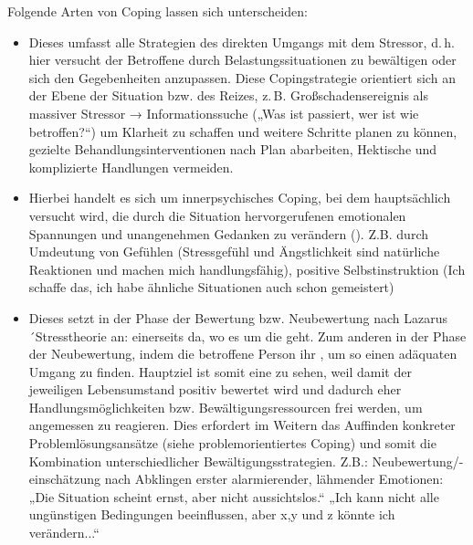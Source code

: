 {Folgende Arten von Coping lassen sich unterscheiden\cite{ZimbardoPsych6}:

\begin{itemize}
  \item {}
  Dieses umfasst alle Strategien des direkten Umgangs mit dem
  Stressor, d.\,h. hier versucht der Betroffene durch
   Belastungssituationen zu
  bewältigen oder sich den Gegebenheiten anzupassen. Diese
  Copingstrategie orientiert sich an der Ebene der Situation
  bzw. des Reizes, z.\,B. Großschadensereignis als massiver Stressor → Informationssuche („Was ist passiert, wer ist wie betroffen?“) um Klarheit zu schaffen und weitere Schritte planen zu können, gezielte Behandlungsinterventionen nach Plan abarbeiten, Hektische und komplizierte Handlungen vermeiden.
  \item {}
  Hierbei handelt es sich um innerpsychisches Coping, bei dem
  hauptsächlich versucht wird, die durch die Situation
  hervorgerufenen emotionalen Spannungen und unangenehmen
  Gedanken zu verändern (). Z.B. durch Umdeutung von Gefühlen (Stressgefühl und Ängstlichkeit sind natürliche Reaktionen und machen mich handlungsfähig), positive Selbstinstruktion (Ich schaffe das, ich habe ähnliche Situationen auch schon gemeistert)
  \item {}
  Dieses setzt in der Phase der Bewertung bzw. Neubewertung
  nach Lazarus´Stresstheorie an: einerseits da, wo es um die
   geht. Zum anderen in der Phase
  der Neubewertung, indem die betroffene Person ihr
  , um so
  einen adäquaten Umgang zu finden. Hauptziel ist somit eine
   zu sehen, weil damit
  der jeweiligen Lebensumstand positiv bewertet wird und
  dadurch eher Handlungsmöglichkeiten bzw.
  Bewältigungsressourcen frei werden, um angemessen zu
  reagieren. Dies erfordert im Weitern das Auffinden konkreter
  Problemlösungsansätze (siehe problemorientiertes Coping) und
  somit die Kombination unterschiedlicher
  Bewältigungsstrategien. Z.B.: Neubewertung/-einschätzung nach Abklingen erster alarmierender, lähmender Emotionen: „Die Situation scheint ernst, aber nicht aussichtslos.“ „Ich kann nicht alle ungünstigen Bedingungen beeinflussen, aber x,y und z könnte ich verändern...“
\end{itemize}

}
{}
{}
{}
{}




